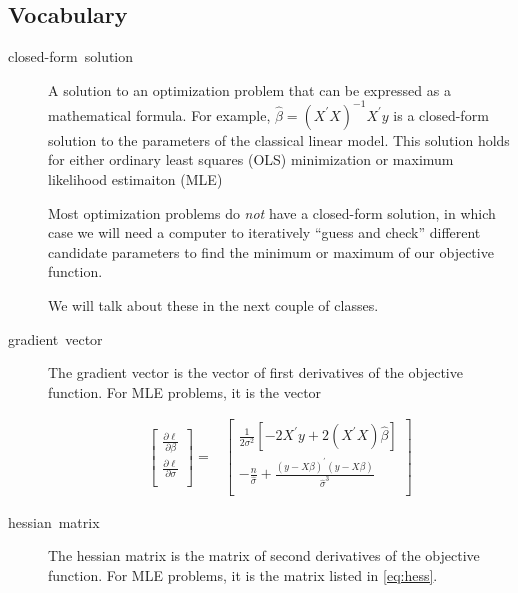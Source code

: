 \documentclass[12pt,english]{article}
\begin{document}
\subsection{Vocabulary}
\begin{description}
    \item[closed-form~solution] A solution to an optimization problem that can be expressed as a mathematical formula. For example, $\hat{\beta} = \left(X^{\prime}X\right)^{-1}X^{\prime}y$ is a closed-form solution to the parameters of the classical linear model. This solution holds for either ordinary least squares (OLS) minimization or maximum likelihood estimaiton (MLE)

        Most optimization problems do \emph{not} have a closed-form solution, in which case we will need a computer to iteratively ``guess and check'' different candidate parameters to find the minimum or maximum of our objective function.

        We will talk about these in the next couple of classes.

    \item[gradient~vector] The gradient vector is the vector of first derivatives of the objective function. For MLE problems, it is the vector
 
        \begin{align*}
    \left[ {\begin{array}{c}
                \frac{\partial\ell}{\partial\beta}  \\
                \frac{\partial\ell}{\partial\sigma} \\
                  \end{array} } \right]
                  =&
    \left[ {\begin{array}{c}
\frac{1}{2\sigma^{2}}\left[-2X^{\prime}y +2\left(X^{\prime}X\right)\hat{\beta}\right] \\
-\frac{n}{\hat{\sigma}} +  \frac{\left(y-X\beta\right)^{\prime}\left(y-X\beta\right)}{\hat{\sigma}^{3}} \\
                  \end{array} } \right]
        \end{align*}

\item[hessian~matrix] The hessian matrix is the matrix of second derivatives of the objective function. For MLE problems, it is the matrix listed in \eqref{eq:hess}.

\end{description}
\end{document}
